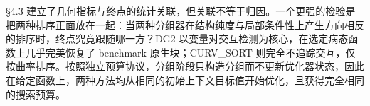 §4.3 建立了几何指标与终点的统计关联，但关联不等于归因。一个更强的检验是把两种排序正面放在一起：当两种分组器在结构纯度与局部条件性上产生方向相反的排序时，终点究竟跟随哪一方？DG2 以变量对交互检测为核心，在选定病态函数上几乎完美恢复了 benchmark 原生块；CURV\_SORT 则完全不追踪交互，仅按曲率排序。按照独立预算协议，分组阶段只构造分组而不更新优化器状态，因此在给定函数上，两种方法均从相同的初始上下文目标值开始优化，且获得完全相同的搜索预算。
